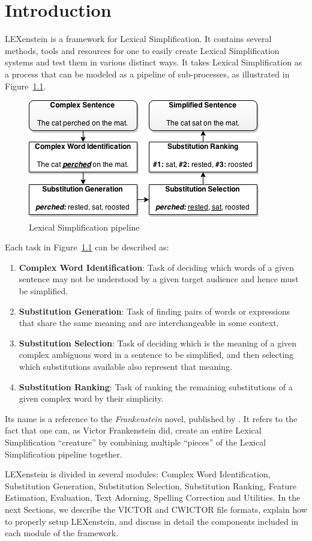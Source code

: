 \chapter{Introduction}

LEXenstein is a framework for Lexical Simplification. It contains several methods, tools and resources for one to easily create Lexical Simplification systems and test them in various distinct ways. It takes Lexical Simplification as a process that can be modeled as a pipeline of sub-processes, as illustrated in Figure~\ref{fig:exlepipe}.

\begin{figure}[htbp!] 
\centering    
\includegraphics[scale=0.8]{Figs/diagramshadow.png}
\caption{Lexical Simplification pipeline}
\label{fig:exlepipe}
\end{figure}

Each task in Figure~\ref{fig:exlepipe} can be described as:

\begin{enumerate}
\item \textbf{Complex Word Identification}: Task of deciding which words of a given sentence may not be understood by a given target audience and hence must be simplified.

\item \textbf{Substitution Generation}: Task of finding pairs of words or expressions that share the same meaning and are interchangeable in some context.

\item \textbf{Substitution Selection}: Task of deciding which is the meaning of a given complex ambiguous word in a sentence to be simplified, and then selecting which substitutions available also represent that meaning.

\item \textbf{Substitution Ranking}: Task of ranking the remaining substitutions of a given complex word by their simplicity.
\end{enumerate}

Its name is a reference to the \textit{Frankenstein} novel, published by \cite{frankenstein}. It refers to the fact that one can, as Victor Frankenstein did, create an entire Lexical Simplification ``creature'' by combining multiple ``pieces'' of the Lexical Simplification pipeline together.

LEXenstein is divided in several modules: Complex Word Identification, Substitution Generation, Substitution Selection, Substitution Ranking, Feature Estimation, Evaluation, Text Adorning, Spelling Correction and Utilities. In the next Sections, we describe the VICTOR and CWICTOR file formats, explain how to properly setup LEXenstein, and discuss in detail the components included in each module of the framework.
